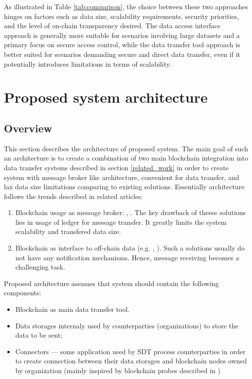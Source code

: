 \documentclass[10pt]{llncs}
\begin{document}
As illustrated in Table \ref{tab:comparison}, the choice between these two approaches hinges on factors such as data size, scalability requirements, security priorities, 
and the level of on-chain transparency desired. 
The data access interface approach is generally more suitable for scenarios involving large datasets and a primary focus on secure access control, while the data transfer tool 
approach is better suited for scenarios demanding secure and direct data transfer, even if it potentially introduces limitations in terms of scalability.

\section{Proposed system architecture} \label{architecture}

\subsection{Overview}

This section describes the architecture of proposed system.
The main goal of such an architecture is to create a combination of two main blockchain integration into data transfer systems described in section \ref{related_work}
in order to create system with message broker like architecture, convenient for data transfer, and lax data size limitations comparing to existing solutions.
Essentially architecture follows the trends described in related articles:

\begin{enumerate}
    \item Blockchain usage as message broker: \cite{Ghaemi2021}, \cite{kim2020hybrid}. 
    The key drawback of theese solutions lies in usage of ledger for message transfer.
    It greatly limits the system scalability and transfered data size. 
    \item Blockchain as interface to off-chain data (e.g. \cite{Jia2023}, \cite{Wang2024}).
    Such a solutions usually do not have any notification mechanisms.
    Hence, message receiving becomes a challenging task.
\end{enumerate}

Proposed architecture assumes that system should contain the following components:

\begin{itemize}
    \item Blockchain as main data transfer tool. 
    \item Data storages internaly used by counterparties (organizations) to store the data to be sent;
    \item Connectors --- some application used by SDT process counterparties in order to create connection between their data storages
    and blockchain nodes owned by organization (mainly inspired by blockchain probes described in \cite{Jia2023})
\end{itemize}
\end{document}

